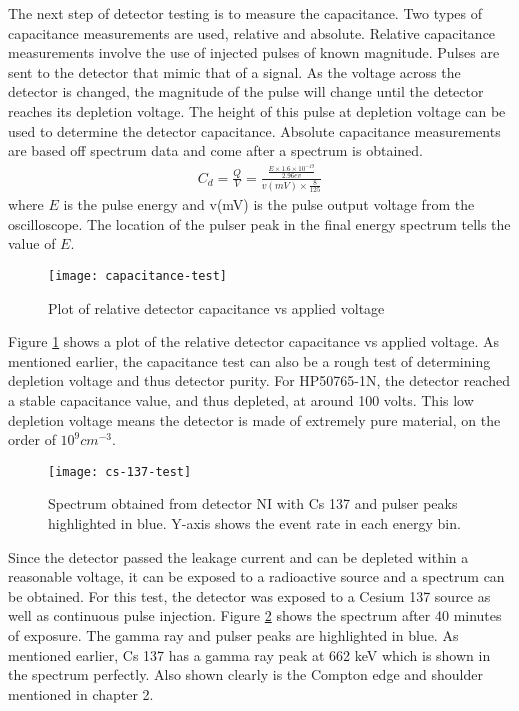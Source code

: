 The next step of detector testing is to measure the capacitance.
Two types of capacitance measurements are used, relative and absolute.
Relative capacitance measurements involve the use of injected pulses of known magnitude.
Pulses are sent to the detector that mimic that of a signal.
As the voltage across the detector is changed, the magnitude of the pulse will change until the detector reaches its depletion voltage.
The height of this pulse at depletion voltage can be used to determine the detector capacitance.
Absolute capacitance measurements are based off spectrum data and come after a spectrum is obtained.
\begin{align*}
C_d=\frac{Q}{V}=\frac{\frac{E\times 1.6\times 10^{-19}}{2.96ev}}{v(mV)\times \frac{8}{125}}
\end{align*}
where $E$ is the pulse energy and v(mV) is the pulse output voltage from the oscilloscope. The location of the pulser peak in the final energy spectrum tells the value of $E$.

\begin{figure}[htpb]
\centering
\texttt{[image: capacitance-test]}
\caption{Plot of relative detector capacitance vs applied voltage}
\label{fig:capacitance-test}
\end{figure}
Figure \ref{fig:capacitance-test} shows a plot of the relative detector capacitance vs applied voltage.
As mentioned earlier, the capacitance test can also be a rough test of determining depletion voltage and thus detector purity.
For HP50765-1N, the detector reached a stable capacitance value, and thus depleted, at around 100 volts.
This low depletion voltage means the detector is made of extremely pure material, on the order of $10^{9}cm^{-3}$.

\begin{figure}[htpb]
\centering
\texttt{[image: cs-137-test]}
\caption{Spectrum obtained from detector NI with Cs 137 and pulser peaks highlighted in blue. Y-axis shows the event rate in each energy bin.}
\label{fig:cs-137-test}
\end{figure}
Since the detector passed the leakage current and can be depleted within a reasonable voltage, it can be exposed to a radioactive source and a spectrum can be obtained.
For this test, the detector was exposed to a Cesium 137 source as well as continuous pulse injection.
Figure \ref{fig:cs-137-test} shows the spectrum after 40 minutes of exposure.
The gamma ray and pulser peaks are highlighted in blue.
As mentioned earlier, Cs 137 has a gamma ray peak at 662 keV which is shown in the spectrum perfectly.
Also shown clearly is the Compton edge and shoulder mentioned in chapter 2.

